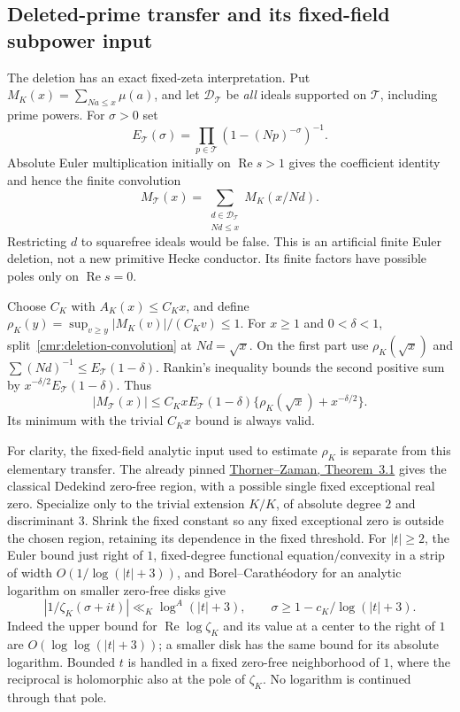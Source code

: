 \documentclass[11pt]{article}
\theoremstyle{definition}\newtheorem{definition}[theorem]{Definition}
\theoremstyle{remark}\newtheorem{remark}[theorem]{Remark}
\begin{document}
\subsection{Deleted-prime transfer and its fixed-field subpower input}
\label{cmr:deleted-transfer}
The deletion has an exact fixed-zeta interpretation. Put
$M_K(x)=\sum_{Na\le x}\mu(a)$, and let $\mathcal D_{\mathcal T}$ be
\emph{all} ideals supported on $\mathcal T$, including prime powers.
For $\sigma>0$ set
\[
 E_{\mathcal T}(\sigma)=
       \prod_{p\in\mathcal T}(1-(Np)^{-\sigma})^{-1}.
\]
Absolute Euler multiplication initially on $\operatorname{Re}s>1$
gives the coefficient identity and hence the finite convolution
\begin{equation}\label{cmr:deletion-convolution}
 M_{\mathcal T}(x)=
       \sum_{\substack{d\in\mathcal D_{\mathcal T}\\Nd\le x}}
                         M_K(x/Nd).
\end{equation}
Restricting $d$ to squarefree ideals would be false.
This is an artificial finite Euler deletion, not a new primitive
Hecke conductor. Its finite factors have possible poles only on
$\operatorname{Re}s=0$.

Choose $C_K$ with $A_K(x)\le C_Kx$, and define
$\rho_K(y)=\sup_{v\ge y}|M_K(v)|/(C_Kv)\le1$.
For $x\ge1$ and $0<\delta<1$, split~\eqref{cmr:deletion-convolution}
at $Nd=\sqrt x$. On the first part use $\rho_K(\sqrt x)$ and
$\sum(Nd)^{-1}\le E_{\mathcal T}(1-\delta)$.
Rankin's inequality bounds the second positive sum by
$x^{-\delta/2}E_{\mathcal T}(1-\delta)$. Thus
\begin{equation}\label{cmr:deletion-bound}
 |M_{\mathcal T}(x)|\le C_KxE_{\mathcal T}(1-\delta)
                    \{\rho_K(\sqrt x)+x^{-\delta/2}\}.
\end{equation}
Its minimum with the trivial $C_Kx$ bound is always valid.

For clarity, the fixed-field analytic input used to estimate $\rho_K$
is separate from this elementary transfer. The already pinned
\href{https://doi.org/10.2140/ant.2019.13.1039}{Thorner--Zaman,
Theorem~3.1} gives the classical Dedekind zero-free region, with a
possible single fixed exceptional real zero. Specialize only to the
trivial extension $K/K$, of absolute degree $2$ and discriminant $3$.
Shrink the fixed constant so any fixed exceptional zero is outside the
chosen region, retaining its dependence in the fixed threshold.
For $|t|\ge2$, the Euler bound just right of $1$, fixed-degree
functional equation/convexity in a strip of width $O(1/\log(|t|+3))$,
and Borel--Carath\'eodory for an analytic logarithm on smaller zero-free
disks give
\[
 |1/\zeta_K(\sigma+it)|\ll_K\log^A(|t|+3),\qquad
 \sigma\ge1-c_K/\log(|t|+3).
\]
Indeed the upper bound for $\operatorname{Re}\log\zeta_K$ and its value
at a center to the right of $1$ are $O(\log\log(|t|+3))$; a smaller
disk has the same bound for its absolute logarithm.
Bounded $t$ is handled in a fixed zero-free neighborhood of $1$,
where the reciprocal is holomorphic also at the pole of $\zeta_K$.
No logarithm is continued through that pole.
\end{document}
